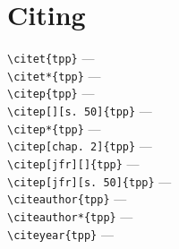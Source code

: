 \section{Citing}

\verb+\citet{tpp}+ --- \citet{tpp} \\
\verb+\citet*{tpp}+ --- \citet*{tpp} \\
\verb+\citep{tpp}+ --- \citep{tpp} \\
\verb+\citep[][s. 50]{tpp}+ --- \citep[][s. 50]{tpp} \\
\verb+\citep*{tpp}+ --- \citep*{tpp} \\
\verb+\citep[chap. 2]{tpp}+ --- \citep[chap. 2]{tpp} \\
\verb+\citep[jfr][]{tpp}+ --- \citep[jfr][]{tpp} \\
\verb+\citep[jfr][s. 50]{tpp}+ --- \citep[jfr][s. 50]{tpp} \\
\verb+\citeauthor{tpp}+ --- \citeauthor{tpp} \\
\verb+\citeauthor*{tpp}+ --- \citeauthor*{tpp} \\
\verb+\citeyear{tpp}+ --- \citeyear{tpp}
